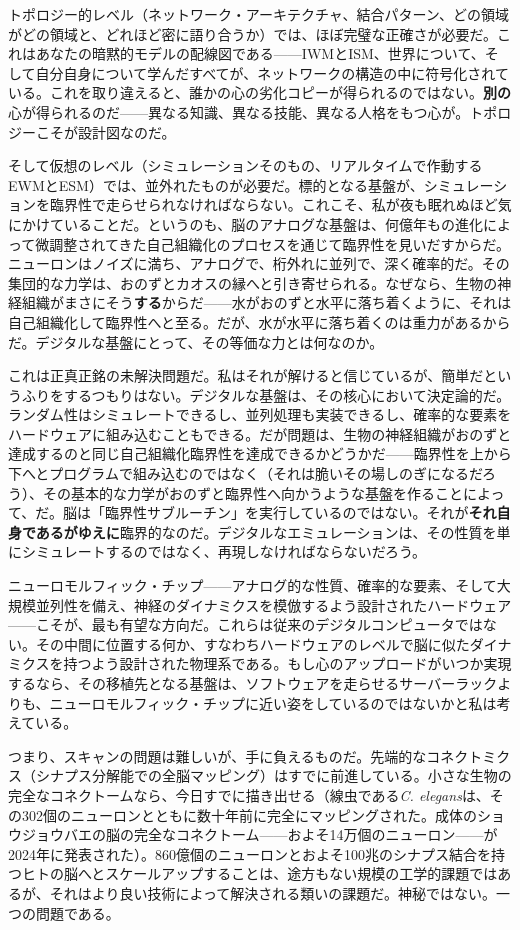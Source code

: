 \documentclass[11pt, twoside, openright]{book}
\begin{document}
トポロジー的レベル（ネットワーク・アーキテクチャ、結合パターン、どの領域がどの領域と、どれほど密に語り合うか）では、ほぼ完璧な正確さが必要だ。これはあなたの暗黙的モデルの配線図である------IWMとISM、世界について、そして自分自身について学んだすべてが、ネットワークの構造の中に符号化されている。これを取り違えると、誰かの心の劣化コピーが得られるのではない。\textbf{別の}心が得られるのだ------異なる知識、異なる技能、異なる人格をもつ心が。トポロジーこそが設計図なのだ。

そして仮想のレベル（シミュレーションそのもの、リアルタイムで作動するEWMとESM）では、並外れたものが必要だ。標的となる基盤が、シミュレーションを臨界性で走らせられなければならない。これこそ、私が夜も眠れぬほど気にかけていることだ。というのも、脳のアナログな基盤は、何億年もの進化によって微調整されてきた自己組織化のプロセスを通じて臨界性を見いだすからだ。ニューロンはノイズに満ち、アナログで、桁外れに並列で、深く確率的だ。その集団的な力学は、おのずとカオスの縁へと引き寄せられる。なぜなら、生物の神経組織がまさにそう\textbf{する}からだ------水がおのずと水平に落ち着くように、それは自己組織化して臨界性へと至る。だが、水が水平に落ち着くのは重力があるからだ。デジタルな基盤にとって、その等価な力とは何なのか。

これは正真正銘の未解決問題だ。私はそれが解けると信じているが、簡単だというふりをするつもりはない。デジタルな基盤は、その核心において決定論的だ。ランダム性はシミュレートできるし、並列処理も実装できるし、確率的な要素をハードウェアに組み込むこともできる。だが問題は、生物の神経組織がおのずと達成するのと同じ自己組織化臨界性を達成できるかどうかだ------臨界性を上から下へとプログラムで組み込むのではなく（それは脆いその場しのぎになるだろう）、その基本的な力学がおのずと臨界性へ向かうような基盤を作ることによって、だ。脳は「臨界性サブルーチン」を実行しているのではない。それが\textbf{それ自身であるがゆえに}臨界的なのだ。デジタルなエミュレーションは、その性質を単にシミュレートするのではなく、再現しなければならないだろう。

ニューロモルフィック・チップ------アナログ的な性質、確率的な要素、そして大規模並列性を備え、神経のダイナミクスを模倣するよう設計されたハードウェア------こそが、最も有望な方向だ。これらは従来のデジタルコンピュータではない。その中間に位置する何か、すなわちハードウェアのレベルで脳に似たダイナミクスを持つよう設計された物理系である。もし心のアップロードがいつか実現するなら、その移植先となる基盤は、ソフトウェアを走らせるサーバーラックよりも、ニューロモルフィック・チップに近い姿をしているのではないかと私は考えている。

つまり、スキャンの問題は難しいが、手に負えるものだ。先端的なコネクトミクス（シナプス分解能での全脳マッピング）はすでに前進している。小さな生物の完全なコネクトームなら、今日すでに描き出せる（線虫である\textit{C. elegans}は、その302個のニューロンとともに数十年前に完全にマッピングされた。成体のショウジョウバエの脳の完全なコネクトーム------およそ14万個のニューロン------が2024年に発表された）。860億個のニューロンとおよそ100兆のシナプス結合を持つヒトの脳へとスケールアップすることは、途方もない規模の工学的課題ではあるが、それはより良い技術によって解決される類いの課題だ。神秘ではない。一つの問題である。
\end{document}
